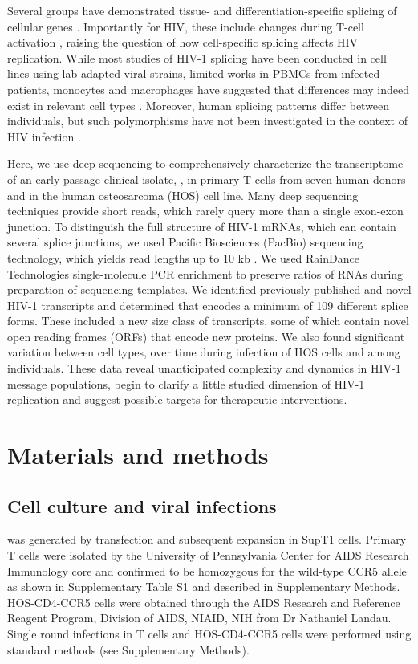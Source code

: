 \documentclass[../sherrill-Mix_thesis.tex]{subfiles}
\begin{document}
Several groups have demonstrated tissue- and differentiation-specific splicing of cellular genes \citep{Wang2008,Grabowski2011,Llorian2011}. Importantly for HIV, these include changes during T-cell activation \citep{Ip2007,Topp2008}, raising the question of how cell-specific splicing affects HIV replication. While most studies of HIV-1 splicing have been conducted in cell lines using lab-adapted viral strains, limited works in PBMCs from infected patients, monocytes and macrophages have suggested that differences may indeed exist in relevant cell types \citep{Carrera2010,Saltarelli1996,Sonza2002,Dowling2008}. Moreover, human splicing patterns differ between individuals, but such polymorphisms have not been investigated in the context of HIV infection \citep{Hull2007,Kwan2007}.

Here, we use deep sequencing to comprehensively characterize the transcriptome of an early passage clinical isolate, \hivEight{} \citep{Collman1992}, in primary \cdFour{} T cells from seven human donors and in the human osteosarcoma (HOS) cell line. Many deep sequencing techniques provide short reads, which rarely query more than a single exon-exon junction. To distinguish the full structure of HIV-1 mRNAs, which can contain several splice junctions, we used Pacific Biosciences (PacBio) sequencing technology, which yields read lengths up to 10 kb \citep{Eid2009}. We used RainDance Technologies single-molecule PCR enrichment to preserve ratios of RNAs during preparation of sequencing templates. We identified previously published and novel HIV-1 transcripts and determined that \hivEight{} encodes a minimum of 109 different splice forms. These included a new size class of transcripts, some of which contain novel open reading frames (ORFs) that encode new proteins. We also found significant variation between cell types, over time during infection of HOS cells and among individuals. These data reveal unanticipated complexity and dynamics in HIV-1 message populations, begin to clarify a little studied dimension of HIV-1 replication and suggest possible targets for therapeutic interventions. 

\section{Materials and methods}
\subsection{Cell culture and viral infections}
\hivEight{} was generated by transfection and subsequent expansion in SupT1 cells. Primary T cells were isolated by the University of Pennsylvania Center for AIDS Research Immunology core and confirmed to be homozygous for the wild-type CCR5 allele as shown in Supplementary Table S1 and described in Supplementary Methods. HOS-CD4-CCR5 cells \citep{Deng1996,Landau1992} were obtained through the AIDS Research and Reference Reagent Program, Division of AIDS, NIAID, NIH from Dr Nathaniel Landau. Single round infections in T cells and HOS-CD4-CCR5 cells were performed using standard methods (see Supplementary Methods). 
\end{document}
